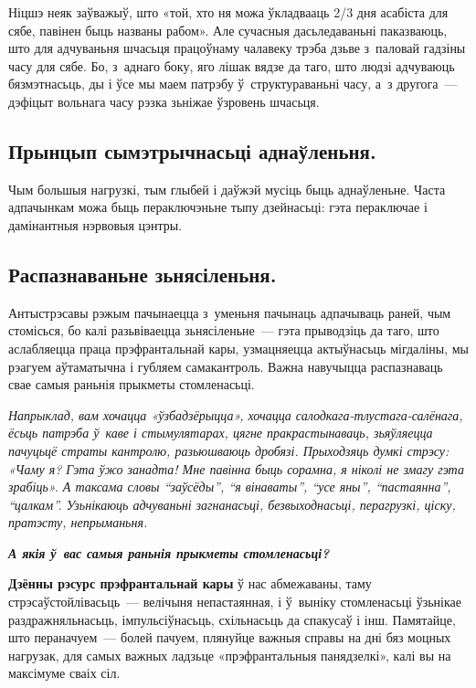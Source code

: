 
Ніцшэ неяк заўважыў, што «той, хто ня можа ўкладвааць 2/3 дня асабіста для сябе, павінен быць названы рабом». Але сучасныя дасьледаваньні паказваюць, што для адчуваньня шчасьця працоўнаму чалавеку трэба дзьве з~паловай гадзіны часу для сябе. Бо, з~аднаго боку, яго лішак вядзе да таго, што людзі адчуваюць бязмэтнасьць, ды і ўсе мы маем патрэбу ў~структураваньні часу, а~з другога~--- дэфіцыт вольнага часу рэзка зьніжае ўзровень шчасьця.

\subsection*{Прынцып сымэтрычнасьці аднаўленьня.}

Чым большыя нагрузкі, тым глыбей і даўжэй мусіць быць аднаўленьне. Часта адпачынкам можа быць пераключэньне тыпу дзейнасьці: гэта пераключае і дамінантныя нэрвовыя цэнтры.

\subsection*{Распазнаваньне зьнясіленьня.}

Антыстрэсавы рэжым пачынаецца з~уменьня пачынаць адпачываць раней, чым стомісься, бо калі разьвіваецца зьнясіленьне~--- гэта прыводзіць да таго, што аслабляецца праца прэфрантальнай кары, узмацняецца актыўнасьць мігдаліны, мы рэагуем аўтаматычна і губляем самакантроль. Важна навучыцца распазнаваць свае самыя раньнія прыкметы стомленасьці. 

\emph{Напрыклад, вам хочацца «ўзбадзёрыцца», хочацца салодкага-тлустага-салёнага, ёсьць патрэба ў~каве і стымулятарах, цягне пракрастынаваць, зьяўляецца пачуцьцё страты кантролю, разьюшваюць дробязі. Прыходзяць думкі стрэсу: «Чаму я? Гэта ўжо занадта! Мне павінна быць сорамна, я ніколі не змагу гэта зрабіць». А таксама словы ``заўсёды'', ``я вінаваты'', ``усе яны'', ``пастаянна'', ``цалкам''. Узьнікаюць адчуваньні загнанасьці, безвыходнасьці, перагрузкі, ціску, пратэсту, непрыманьня.}

\emph{\textbf{А якія ў~вас самыя раньнія прыкметы стомленасьці?}}

\textbf{Дзённы рэсурс прэфрантальнай кары} ў нас абмежаваны, таму стрэсаўстойлівасьць~--- велічыня непастаянная, і ў~выніку стомленасьці ўзьнікае раздражняльнасьць, імпульсіўнасьць, схільнасьць да спакусаў і інш. Памятайце, што пераначуем~--- болей пачуем, плянуйце важныя справы на дні бяз моцных нагрузак, для самых важных ладзьце «прэфрантальныя панядзелкі», калі вы на максімуме сваіх сіл. 

